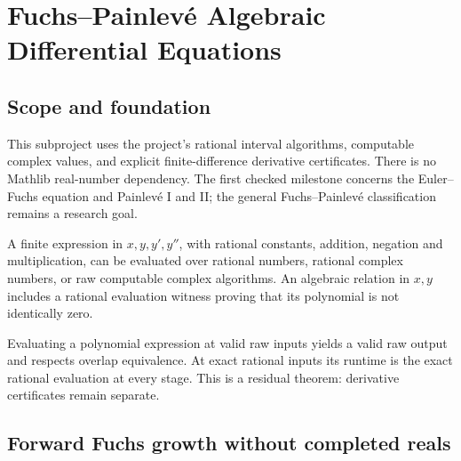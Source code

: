 \chapter{Fuchs--Painlev\'e Algebraic Differential Equations}
\label{ch:algebraic-ode}

\section{Scope and foundation}

This subproject uses the project's rational interval algorithms, computable
complex values, and explicit finite-difference derivative certificates.
There is no Mathlib real-number dependency. The first checked milestone
concerns the Euler--Fuchs equation and Painlev\'e I and II; the general
Fuchs--Painlev\'e classification remains a research goal.

\begin{definition}
\label{def:algebraic-ode-residual}
A finite expression in $x,y,y',y''$, with rational constants, addition,
negation and multiplication, can be evaluated over rational numbers,
rational complex numbers, or raw computable complex algorithms.
An algebraic relation in $x,y$ includes a rational evaluation witness proving
that its polynomial is not identically zero.
\leanok
\end{definition}

\begin{theorem}
\label{thm:algebraic-ode-runtime}
Evaluating a polynomial expression at valid raw inputs yields a valid raw
output and respects overlap equivalence. At exact rational inputs its
runtime is the exact rational evaluation at every stage.
This is a residual theorem: derivative certificates remain separate.
\leanok
\end{theorem}

\section{Forward Fuchs growth without completed reals}

